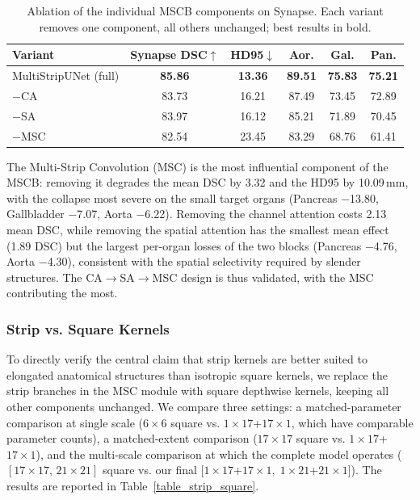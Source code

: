 \documentclass{llncs}
\begin{document}
\begin{table}[!htbp]
\centering
\footnotesize
\caption{Ablation of the individual MSCB components on Synapse. Each variant removes one component, all others unchanged; best results in bold.}
\label{table_slcb_ablation}
\begin{tabular}{l|cc|ccc}
\hline
Variant & Synapse DSC$\uparrow$ & HD95$\downarrow$ & Aor. & Gal. & Pan. \\
\hline
MultiStripUNet (full) & \textbf{85.86} & \textbf{13.36} & \textbf{89.51} & \textbf{75.83} & \textbf{75.21} \\
$-$CA  & 83.73 & 16.21 & 87.49 & 73.45 & 72.89 \\
$-$SA  & 83.97 & 16.12 & 85.21 & 71.89 & 70.45 \\
$-$MSC & 82.54 & 23.45 & 83.29 & 68.76 & 61.41 \\
\hline
\end{tabular}
\end{table}

The Multi-Strip Convolution (MSC) is the most influential component of the MSCB: removing it degrades the mean DSC by 3.32 and the HD95 by 10.09\,mm, with the collapse most severe on the small target organs (Pancreas $-$13.80, Gallbladder $-$7.07, Aorta $-$6.22). Removing the channel attention costs 2.13 mean DSC, while removing the spatial attention has the smallest mean effect (1.89 DSC) but the largest per-organ losses of the two blocks (Pancreas $-$4.76, Aorta $-$4.30), consistent with the spatial selectivity required by slender structures. The CA$\rightarrow$SA$\rightarrow$MSC design is thus validated, with the MSC contributing the most.

\subsubsection{Strip vs. Square Kernels}

To directly verify the central claim that strip kernels are better suited to elongated anatomical structures than isotropic square kernels, we replace the strip branches in the MSC module with square depthwise kernels, keeping all other components unchanged. We compare three settings: a matched-parameter comparison at single scale ($6\times6$ square vs. $1\times17$+$17\times1$, which have comparable parameter counts), a matched-extent comparison ($17\times17$ square vs. $1\times17$+$17\times1$), and the multi-scale comparison at which the complete model operates ($[17\times17,\,21\times21]$ square vs. our final $[1\times17$+$17\times1,\;1\times21$+$21\times1]$). The results are reported in Table~\ref{table_strip_square}.
\end{document}
